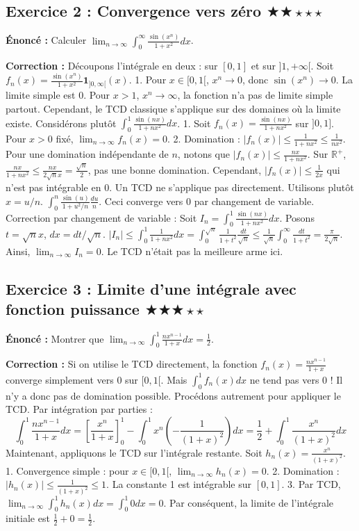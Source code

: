 \documentclass[11pt,a4paper]{article}
\begin{document}
\subsection*{Exercice 2 : Convergence vers zéro \quad $\bigstar\bigstar\star\star\star$}

\textbf{Énoncé :}
Calculer $\lim_{n \to \infty} \int_0^\infty \frac{\sin(x^n)}{1 + x^2} dx$.

\textbf{Correction :}
Découpons l'intégrale en deux : sur $[0, 1]$ et sur $]1, +\infty[$.
Soit $f_n(x) = \frac{\sin(x^n)}{1 + x^2} \mathbf{1}_{]0, \infty[}(x)$.
1. Pour $x \in [0, 1[$, $x^n \to 0$, donc $\sin(x^n) \to 0$. La limite simple est 0.
Pour $x > 1$, $x^n \to \infty$, la fonction n'a pas de limite simple partout. Cependant, le TCD classique s'applique sur des domaines où la limite existe. Considérons plutôt $\int_0^1 \frac{\sin(nx)}{1 + nx^2} dx$.
1. Soit $f_n(x) = \frac{\sin(nx)}{1 + nx^2}$ sur $]0, 1]$. Pour $x > 0$ fixé, $\lim_{n \to \infty} f_n(x) = 0$.
2. Domination : $|f_n(x)| \le \frac{1}{1 + nx^2} \le \frac{1}{nx^2}$.
Pour une domination indépendante de $n$, notons que $|f_n(x)| \le \frac{n x}{1 + nx^2}$. Sur $\mathbb{R}^+$, $\frac{nx}{1+nx^2} \le \frac{nx}{2\sqrt{n}x} = \frac{\sqrt{n}}{2}$, pas une bonne domination.
Cependant, $|f_n(x)| \le \frac{1}{2x}$ qui n'est pas intégrable en 0.
Un TCD ne s'applique pas directement. Utilisons plutôt $x = u/n$.
$\int_0^n \frac{\sin(u)}{1 + u^2/n} \frac{du}{n}$. Ceci converge vers 0 par changement de variable.
Correction par changement de variable :
Soit $I_n = \int_0^1 \frac{\sin(nx)}{1 + nx^2} dx$. Posons $t = \sqrt{n} x$, $dx = dt/\sqrt{n}$.
$|I_n| \le \int_0^1 \frac{1}{1 + nx^2} dx = \int_0^{\sqrt{n}} \frac{1}{1 + t^2} \frac{dt}{\sqrt{n}} \le \frac{1}{\sqrt{n}} \int_0^\infty \frac{dt}{1+t^2} = \frac{\pi}{2\sqrt{n}}$.
Ainsi, $\lim_{n \to \infty} I_n = 0$. Le TCD n'était pas la meilleure arme ici.


\subsection*{{Exercice 3 : Limite d'une intégrale avec fonction puissance \quad $\bigstar\bigstar\bigstar\star\star$}}

\textbf{Énoncé :}
Montrer que $\lim_{n \to \infty} \int_0^1 \frac{n x^{n-1}}{1 + x} dx = \frac{1}{2}$.

\textbf{Correction :}
Si on utilise le TCD directement, la fonction $f_n(x) = \frac{n x^{n-1}}{1 + x}$ converge simplement vers 0 sur $[0, 1[$. Mais $\int_0^1 f_n(x) dx$ ne tend pas vers 0 ! Il n'y a donc pas de domination possible.
Procédons autrement pour appliquer le TCD.
Par intégration par parties :
$$ \int_0^1 \frac{n x^{n-1}}{1 + x} dx = \left[ \frac{x^n}{1+x} \right]_0^1 - \int_0^1 x^n \left(-\frac{1}{(1+x)^2}\right) dx = \frac{1}{2} + \int_0^1 \frac{x^n}{(1+x)^2} dx $$
Maintenant, appliquons le TCD sur l'intégrale restante.
Soit $h_n(x) = \frac{x^n}{(1+x)^2}$.
1. Convergence simple : pour $x \in [0, 1[$, $\lim_{n \to \infty} h_n(x) = 0$.
2. Domination : $|h_n(x)| \le \frac{1}{(1+x)^2} \le 1$. La constante 1 est intégrable sur $[0, 1]$.
3. Par TCD, $\lim_{n \to \infty} \int_0^1 h_n(x) dx = \int_0^1 0 dx = 0$.
Par conséquent, la limite de l'intégrale initiale est $\frac{1}{2} + 0 = \frac{1}{2}$.
\end{document}
